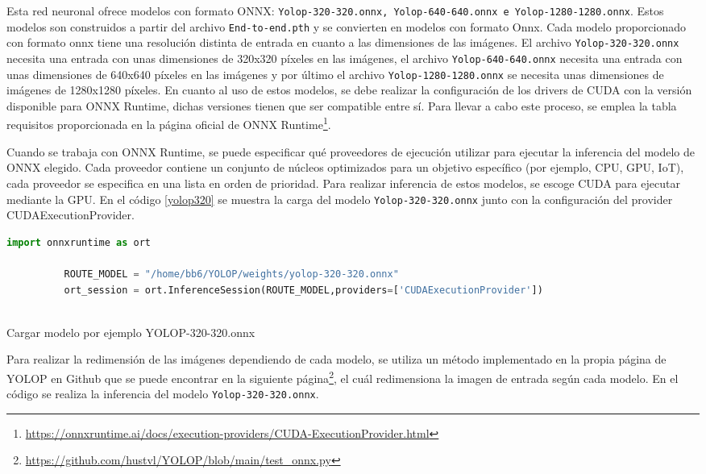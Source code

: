      Esta red neuronal ofrece modelos con formato ONNX: \texttt{Yolop-320-320.onnx, Yolop-640-640.onnx e Yolop-1280-1280.onnx}. Estos modelos son construidos a partir del archivo 
      \texttt{End-to-end.pth} y se convierten en modelos con formato Onnx. Cada modelo proporcionado con formato onnx tiene una resolución distinta de entrada en cuanto a las dimensiones
      de las imágenes. El archivo \texttt{Yolop-320-320.onnx} necesita una entrada con unas dimensiones de 320x320 píxeles en las imágenes, el archivo \texttt{Yolop-640-640.onnx} necesita 
      una entrada con unas dimensiones de 640x640 píxeles en las imágenes y por último el archivo \texttt{Yolop-1280-1280.onnx} se necesita unas dimensiones de imágenes de 1280x1280 píxeles. 
      En cuanto al uso de estos modelos, se debe realizar la configuración de los drivers de CUDA con la versión disponible para ONNX Runtime, 
      dichas versiones tienen que ser compatible entre sí. Para llevar a cabo este proceso, se emplea la tabla requisitos proporcionada en la página oficial de ONNX Runtime\footnote{\url{https://onnxruntime.ai/docs/execution-providers/CUDA-ExecutionProvider.html}}.

      Cuando se trabaja con ONNX Runtime, se puede especificar qué proveedores de ejecución utilizar para ejecutar la inferencia del modelo de ONNX elegido. Cada proveedor 
      contiene un conjunto de núcleos optimizados para un objetivo específico (por ejemplo, CPU, GPU, IoT), cada proveedor se especifica en una lista en orden de prioridad. Para realizar 
      inferencia de estos modelos, se escoge CUDA para ejecutar mediante la GPU. En el código \ref{yolop320} se muestra la carga del modelo \texttt{Yolop-320-320.onnx} junto con la configuración
      del provider CUDAExecutionProvider. 
      
      \begin{code}[h]
        \begin{lstlisting}[language=Python]
          import onnxruntime as ort

          ROUTE_MODEL = "/home/bb6/YOLOP/weights/yolop-320-320.onnx"
          ort_session = ort.InferenceSession(ROUTE_MODEL,providers=['CUDAExecutionProvider'])
      
        \end{lstlisting}
        \caption[Cargar modelo]{Cargar modelo por ejemplo YOLOP-320-320.onnx}
        \label{yolop320}
        \end{code}  

        Para realizar la redimensión de las imágenes dependiendo de cada modelo, se utiliza un método implementado en la propia página de YOLOP en Github 
        que se puede encontrar en la siguiente página\footnote{\url{https://github.com/hustvl/YOLOP/blob/main/test_onnx.py}}, el cuál redimensiona la imagen de entrada según cada modelo. En el código 
        \label{cod:Inferencia_onnx} se realiza la inferencia del modelo \texttt{Yolop-320-320.onnx}. 

